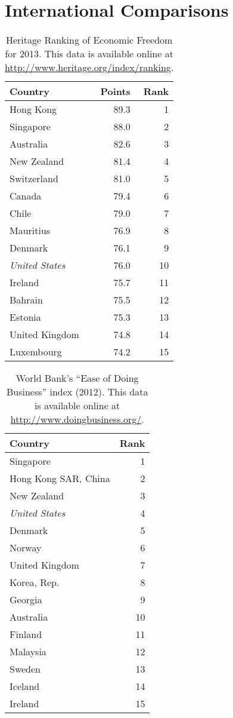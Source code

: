 \chapter{International Comparisons}\label{chpt:international}

\begin{table}
\centering
\begin{tabular}{lrr}
\toprule
Country & Points & Rank \\
\midrule
Hong Kong             & 89.3 &  1 \\
Singapore             & 88.0 &  2 \\
Australia             & 82.6 &  3 \\
New Zealand           & 81.4 &  4 \\
Switzerland           & 81.0 &  5 \\
Canada                & 79.4 &  6 \\
Chile                 & 79.0 &  7 \\
Mauritius             & 76.9 &  8 \\
Denmark               & 76.1 &  9 \\
\emph{United States}  & 76.0 & 10 \\
Ireland               & 75.7 & 11 \\
Bahrain               & 75.5 & 12 \\
Estonia               & 75.3 & 13 \\
United Kingdom        & 74.8 & 14 \\
Luxembourg            & 74.2 & 15 \\
\bottomrule
\end{tabular}
\caption{Heritage Ranking of Economic Freedom for 2013. This data is available
online at \url{http://www.heritage.org/index/ranking}.}
\label{tab:heritage}
\end{table}

\begin{table}
\centering
\begin{tabular}{lr}
\toprule
Country & Rank \\
\midrule
Singapore & 1 \\
Hong Kong SAR, China & 2 \\
New Zealand & 3 \\
\emph{United States} & 4 \\
Denmark & 5 \\
Norway & 6 \\
United Kingdom & 7 \\
Korea, Rep. & 8 \\
Georgia & 9 \\
Australia & 10 \\
Finland & 11 \\
Malaysia & 12 \\
Sweden & 13 \\
Iceland & 14 \\
Ireland & 15 \\
\bottomrule
\end{tabular}
\caption{World Bank's ``Ease of Doing Business'' index (2012). This data is
available online at \url{http://www.doingbusiness.org/}.}
\label{tab:ease-of-doing-business}
\end{table}

